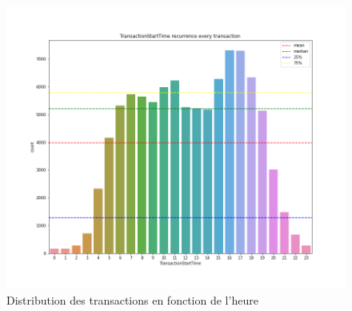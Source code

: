 \documentclass{article}
\begin{document}
\begin{figure}[h]
    \centering
    \includegraphics[scale=0.2]{./images/TransactionStartTime_recurrence_every_transaction.png}
    \caption{Distribution des transactions en fonction de l'heure}


\end{figure}
\end{document}
